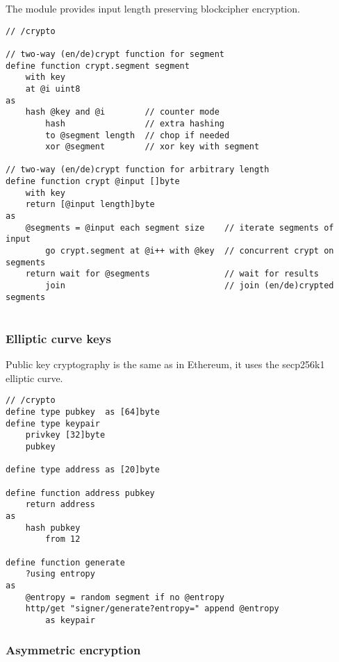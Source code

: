 The module provides input length preserving blockcipher encryption.

\begin{definition}[Blockcipher]\label{def:crypt}
\begin{lstlisting}[language=buzz1]
// /crypto

// two-way (en/de)crypt function for segment
define function crypt.segment segment
    with key
    at @i uint8
as
    hash @key and @i        // counter mode 
        hash                // extra hashing
        to @segment length  // chop if needed
        xor @segment        // xor key with segment

// two-way (en/de)crypt function for arbitrary length 
define function crypt @input []byte
    with key
    return [@input length]byte
as
    @segments = @input each segment size    // iterate segments of input
        go crypt.segment at @i++ with @key  // concurrent crypt on segments
    return wait for @segments               // wait for results
        join                                // join (en/de)crypted segments
        
\end{lstlisting}
\end{definition}    

\subsubsection{Elliptic curve keys}

Public key cryptography is the same as in Ethereum, it uses the secp256k1 elliptic curve.  


\begin{definition}\label{def:ec-keys}
\begin{lstlisting}[language=buzz1]
// /crypto
define type pubkey  as [64]byte
define type keypair
    privkey [32]byte
    pubkey
    
define type address as [20]byte

define function address pubkey
    return address
as 
    hash pubkey 
        from 12

define function generate 
    ?using entropy
as
    @entropy = random segment if no @entropy
    http/get "signer/generate?entropy=" append @entropy 
        as keypair

\end{lstlisting}
\end{definition}    

\subsubsection{Asymmetric encryption}


